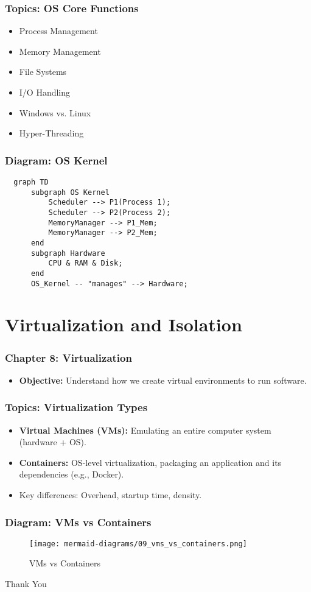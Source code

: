 \documentclass{beamer}
\begin{document}
\begin{frame}[fragile]
  \frametitle{Topics: OS Core Functions}
  \begin{itemize}
    \item Process Management
    \item Memory Management
    \item File Systems
    \item I/O Handling
    \item Windows vs. Linux
    \item Hyper-Threading
  \end{itemize}
\end{frame}

\begin{frame}[fragile]
  \frametitle{Diagram: OS Kernel}
  \begin{verbatim}
  graph TD
      subgraph OS Kernel
          Scheduler --> P1(Process 1);
          Scheduler --> P2(Process 2);
          MemoryManager --> P1_Mem;
          MemoryManager --> P2_Mem;
      end
      subgraph Hardware
          CPU & RAM & Disk;
      end
      OS_Kernel -- "manages" --> Hardware;
  \end{verbatim}
\end{frame}

\section{Virtualization and Isolation}

\begin{frame}
  \frametitle{Chapter 8: Virtualization}
  \begin{itemize}
    \item \textbf{Objective:} Understand how we create virtual environments to run software.
  \end{itemize}
\end{frame}

\begin{frame}[fragile]
  \frametitle{Topics: Virtualization Types}
  \begin{itemize}
    \item \textbf{Virtual Machines (VMs):} Emulating an entire computer system (hardware + OS).
    \item \textbf{Containers:} OS-level virtualization, packaging an application and its dependencies (e.g., Docker).
    \item Key differences: Overhead, startup time, density.
  \end{itemize}
\end{frame}

\begin{frame}[fragile]
  \frametitle{Diagram: VMs vs Containers}
  \begin{figure}
    \texttt{[image: mermaid-diagrams/09\_vms\_vs\_containers.png]}
    \caption{VMs vs Containers}
  \end{figure}
\end{frame}

\begin{frame}
  \Huge{\centerline{Thank You}}
\end{frame}
\end{document}
